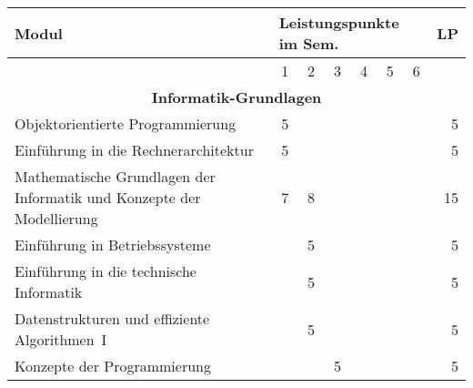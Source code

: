 \begin{table}[tbp]
	\begin{small}
		\begin{tabularx}{\textwidth}{|X||c|c|c|c|c|c||r|}
			\hline
			\textbf{Modul}                                                        & \multicolumn{6}{l||}{\textbf{Leistungspunkte im Sem.}} &                                                           \textbf{LP} \\ \hline
			                                                                      & 1  & 2  & 3  & 4  & 5  &               6               &                                                                       \\ \hline\hline
			\multicolumn{8}{|c|}{\textbf{Informatik-Grundlagen}}                                                                                                                                                   \\ \hline
			Objektorientierte Programmierung                                      & 5  &    &    &    &    &                               &                                                                     5 \\ \hline
			Einführung in die Rechnerarchitektur                                  & 5  &    &    &    &    &                               &                                                                     5 \\ \hline
			Mathematische Grundlagen der Informatik und Konzepte der Modellierung & 7  & 8  &    &    &    &                               &                                                                    15 \\ \hline
			Einführung in Betriebssysteme                                         &    & 5  &    &    &    &                               &                                                                     5 \\ \hline
			Einführung in die technische Informatik                               &    & 5  &    &    &    &                               &                                                                     5 \\ \hline
			Datenstrukturen und effiziente Algorithmen~I                          &    & 5  &    &    &    &                               &                                                                     5 \\ \hline
			Konzepte der Programmierung                                           &    &    & 5  &    &    &                               &                                                                     5 \\ \hline

\end{tabularx}
\end{small}
\end{table}
